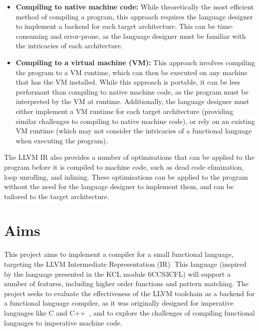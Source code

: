 \begin{itemize}
    \item \textbf{Compiling to native machine code:} While theoretically the most efficient method
          of compiling a program, this approach requires the language designer to implement a
          backend for each target architecture. This can be time-consuming and error-prone, as the
          language designer must be familiar with the intricacies of each architecture.

    \item \textbf{Compiling to a virtual machine (VM):} This approach involves compiling the program
          to a VM runtime, which can then be executed on any machine that has the VM installed.
          While this approach is portable, it can be less performant than compiling to native
          machine code, as the program must be interpreted by the VM at runtime. Additionally, the
          language designer must either implement a VM runtime for each target architecture
          (providing similar challenges to compiling to native machine code), or rely on an existing
          VM runtime (which may not consider the intricacies of a functional language when executing
          the program).
\end{itemize}

The LLVM IR also provides a number of optimisations that can be applied to the program before it is
compiled to machine code, such as dead code elimination, loop unrolling, and inlining. These
optimisations can be applied to the program without the need for the language designer to implement
them, and can be tailored to the target architecture.

\section{Aims}

This project aims to implement a compiler for a small functional language, targeting the LLVM
Intermediate Representation (IR). This language (inspired by the language presented in the KCL
module 6CCS3CFL) will support a number of features, including higher order functions and pattern
matching. The project seeks to evaluate the effectiveness of the LLVM toolchain as a backend for a
functional language compiler, as it was originally designed for imperative languages like C and
C++~\autocite{lattner2004llvm}, and to explore the challenges of compiling functional languages to
imperative machine code.

